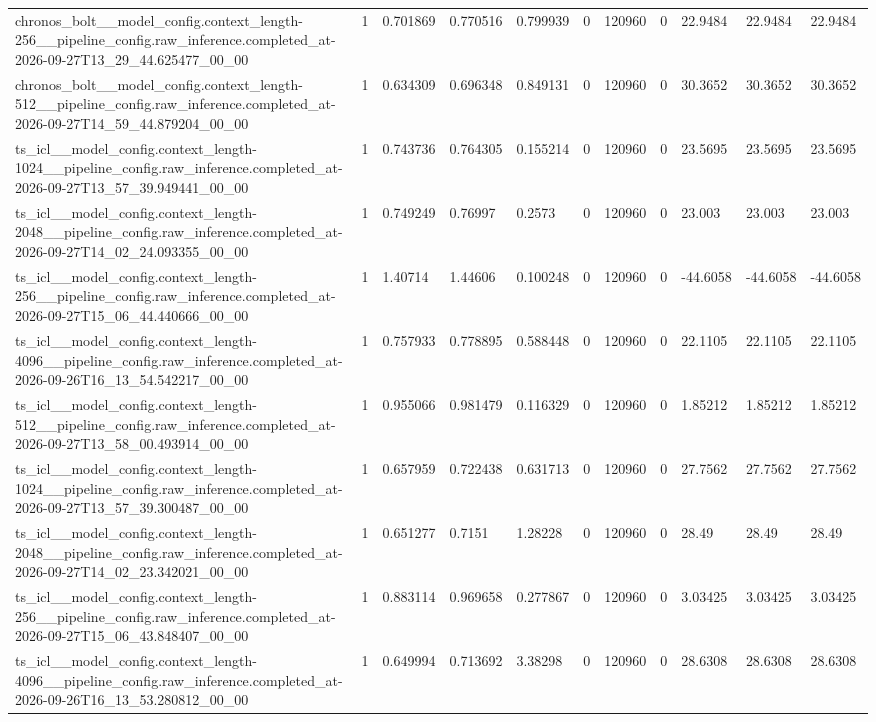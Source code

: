 \begin{tabular}{lllllllllll}
chronos\_bolt\_\_model\_config.context\_length-256\_\_pipeline\_config.raw\_inference.completed\_at-2026-09-27T13\_29\_44.625477\_00\_00 & 1 & 0.701869 & 0.770516 & 0.799939 & 0 & 120960 & 0 & 22.9484 & 22.9484 & 22.9484 \\
chronos\_bolt\_\_model\_config.context\_length-512\_\_pipeline\_config.raw\_inference.completed\_at-2026-09-27T14\_59\_44.879204\_00\_00 & 1 & 0.634309 & 0.696348 & 0.849131 & 0 & 120960 & 0 & 30.3652 & 30.3652 & 30.3652 \\
ts\_icl\_\_model\_config.context\_length-1024\_\_pipeline\_config.raw\_inference.completed\_at-2026-09-27T13\_57\_39.949441\_00\_00 & 1 & 0.743736 & 0.764305 & 0.155214 & 0 & 120960 & 0 & 23.5695 & 23.5695 & 23.5695 \\
ts\_icl\_\_model\_config.context\_length-2048\_\_pipeline\_config.raw\_inference.completed\_at-2026-09-27T14\_02\_24.093355\_00\_00 & 1 & 0.749249 & 0.76997 & 0.2573 & 0 & 120960 & 0 & 23.003 & 23.003 & 23.003 \\
ts\_icl\_\_model\_config.context\_length-256\_\_pipeline\_config.raw\_inference.completed\_at-2026-09-27T15\_06\_44.440666\_00\_00 & 1 & 1.40714 & 1.44606 & 0.100248 & 0 & 120960 & 0 & -44.6058 & -44.6058 & -44.6058 \\
ts\_icl\_\_model\_config.context\_length-4096\_\_pipeline\_config.raw\_inference.completed\_at-2026-09-26T16\_13\_54.542217\_00\_00 & 1 & 0.757933 & 0.778895 & 0.588448 & 0 & 120960 & 0 & 22.1105 & 22.1105 & 22.1105 \\
ts\_icl\_\_model\_config.context\_length-512\_\_pipeline\_config.raw\_inference.completed\_at-2026-09-27T13\_58\_00.493914\_00\_00 & 1 & 0.955066 & 0.981479 & 0.116329 & 0 & 120960 & 0 & 1.85212 & 1.85212 & 1.85212 \\
ts\_icl\_\_model\_config.context\_length-1024\_\_pipeline\_config.raw\_inference.completed\_at-2026-09-27T13\_57\_39.300487\_00\_00 & 1 & 0.657959 & 0.722438 & 0.631713 & 0 & 120960 & 0 & 27.7562 & 27.7562 & 27.7562 \\
ts\_icl\_\_model\_config.context\_length-2048\_\_pipeline\_config.raw\_inference.completed\_at-2026-09-27T14\_02\_23.342021\_00\_00 & 1 & 0.651277 & 0.7151 & 1.28228 & 0 & 120960 & 0 & 28.49 & 28.49 & 28.49 \\
ts\_icl\_\_model\_config.context\_length-256\_\_pipeline\_config.raw\_inference.completed\_at-2026-09-27T15\_06\_43.848407\_00\_00 & 1 & 0.883114 & 0.969658 & 0.277867 & 0 & 120960 & 0 & 3.03425 & 3.03425 & 3.03425 \\
ts\_icl\_\_model\_config.context\_length-4096\_\_pipeline\_config.raw\_inference.completed\_at-2026-09-26T16\_13\_53.280812\_00\_00 & 1 & 0.649994 & 0.713692 & 3.38298 & 0 & 120960 & 0 & 28.6308 & 28.6308 & 28.6308 \\

\end{tabular}
